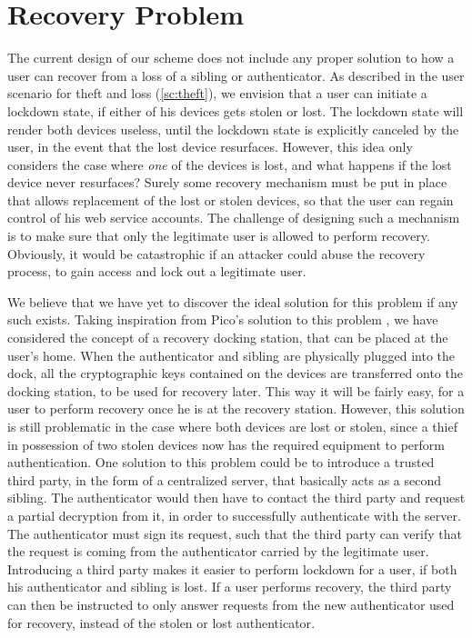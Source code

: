 \section{Recovery Problem}\label{sec:recovery}
The current design of our scheme does not include any proper solution to how a user can recover from a loss of a \gls{sibling} or \gls{authenticator}. As described in the user scenario for theft and loss (\ref{sc:theft}), we envision that a user can initiate a lockdown state, if either of his devices gets stolen or lost. The lockdown state will render both devices useless, until the lockdown state is explicitly canceled by the user, in the event that the lost device resurfaces. However, this idea only considers the case where \textit{one} of the devices is lost, and what happens if the lost device never resurfaces? Surely some recovery mechanism must be put in place that allows replacement of the lost or stolen devices, so that the user can regain control of his web service accounts. The challenge of designing such a mechanism is to make sure that only the legitimate user is allowed to perform recovery. Obviously, it would be catastrophic if an attacker could abuse the recovery process, to gain access and lock out a legitimate user. 

We believe that we have yet to discover the ideal solution for this problem if any such exists. Taking inspiration from Pico's solution to this problem \cite{stajano2011pico}, we have considered the concept of a recovery docking station, that can be placed at the user's home. When the \gls{authenticator} and \gls{sibling} are physically plugged into the dock, all the cryptographic keys contained on the devices are transferred onto the docking station, to be used for recovery later. This way it will be fairly easy, for a user to perform recovery once he is at the recovery station. However, this solution is still problematic in the case where both devices are lost or stolen, since a thief in possession of two stolen devices now has the required equipment to perform authentication. 
One solution to this problem could be to introduce a trusted third party, in the form of a centralized server, that basically acts as a second \gls{sibling}. The \gls{authenticator} would then have to contact the third party and request a partial decryption from it, in order to successfully authenticate with the \gls{server}. The \gls{authenticator} must sign its request, such that the third party can verify that the request is coming from the \gls{authenticator} carried by the legitimate user. Introducing a third party makes it easier to perform lockdown for a user, if both his \gls{authenticator} and \gls{sibling} is lost. If a user performs recovery, the third party can then be instructed to only answer requests from the new \gls{authenticator} used for recovery, instead of the stolen or lost \gls{authenticator}. 

